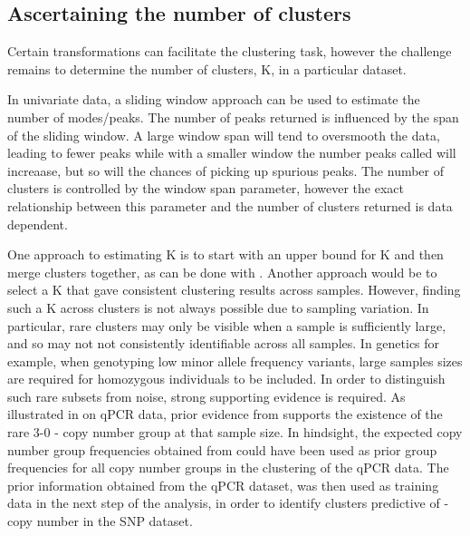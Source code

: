 \subsection{Ascertaining the number of clusters}


Certain transformations can facilitate the clustering task, however the challenge remains to determine the number of clusters, K, in a particular dataset.

In univariate data, a sliding window approach can be used to estimate the number of modes/peaks.
The number of peaks returned is influenced by the span of the sliding window.
A large window span will tend to oversmooth the data, leading to fewer peaks while with a smaller window the number peaks called will increaase, but so will the chances of picking up spurious peaks.
The number of clusters is controlled by the window span parameter, however the exact relationship between this parameter and the number of clusters returned is data dependent.

One approach to estimating K is to start with an upper bound for K and then merge clusters together, as can be done with .
Another approach would be to select a K that gave consistent clustering results across samples.
However, finding such a K across clusters is not always possible due to sampling variation.
In particular, rare clusters may only be visible when a sample is sufficiently large, and so may not not consistently identifiable across all samples.
In genetics for example, when genotyping low minor allele frequency variants, large samples sizes are required for homozygous individuals to be included.
In order to distinguish such rare subsets from noise, strong supporting evidence is required.
As illustrated in  on qPCR data, prior evidence from \citet{Jiang:2012cf} supports the existence of the rare 3-0 - copy number group at that sample size.
In hindsight, the expected copy number group frequencies obtained from \citet{Jiang:2012cf} could have been used as prior group frequencies for all copy number groups in the clustering of the qPCR data.
The prior information obtained from the qPCR dataset, was then used as training data in the next step of the analysis, in order to identify clusters predictive of - copy number in the SNP dataset.

